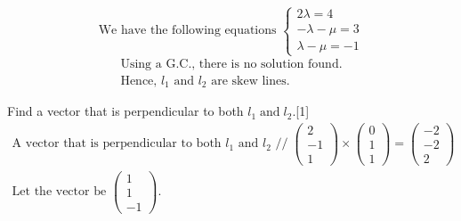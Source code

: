 \documentclass[12pt, a4 paper]{article}
\begin{document}
\begin{outline}[enumerate]
					\[{\textrm{We have the following equations }}\left\{ \begin{array}{l}2\lambda  = 4\\ - \lambda  - \mu  = 3\\\lambda  - \mu  =  - 1\end{array} \right.\]
					\[\begin{array}{l}{\textrm{Using a G}}{\textrm{.C}}{\textrm{., there is no solution found}}{\textrm{.}}\\{\textrm{Hence, }}{l_1}{\textrm{ and }}{l_2}{\textrm{ are skew lines}}{\textrm{.}}\end{array}\]

					\color{black}
					\2 Find a vector that is perpendicular to both ${l_1}\;{\textrm{and}}\;{l_2}$.\hfill[1]
					\color{blue}
					\[\begin{array}{l}{\textrm{A vector that is perpendicular to both }}{l_1}{\textrm{ and }}{l_2}{\textrm{ //}}\;\left( {\begin{array}{*{20}{c}}2\\{ - 1}\\1\end{array}} \right) \times \left( {\begin{array}{*{20}{c}}0\\1\\1\end{array}} \right) = \left( {\begin{array}{*{20}{c}}{ - 2}\\{ - 2}\\2\end{array}} \right)\\{\textrm{Let the vector be }}\left( {\begin{array}{*{20}{c}}1\\1\\{ - 1}\end{array}} \right).\end{array}\]


\end{outline}
\end{document}
